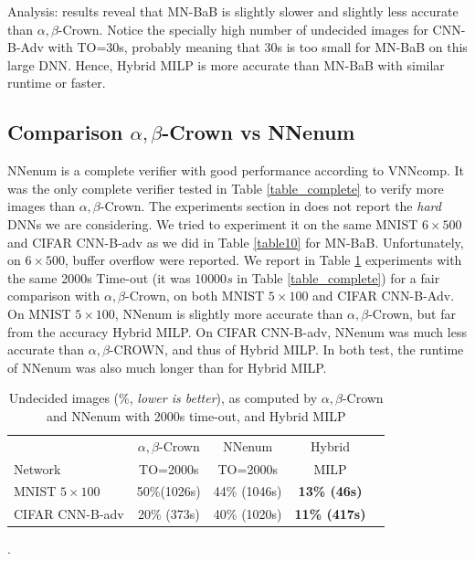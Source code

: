 {Analysis: results reveal that MN-BaB is slightly slower and slightly less accurate than $\alpha,\beta$-Crown. Notice the specially high number of undecided images for CNN-B-Adv with TO=30s, probably meaning that 30s is too small for MN-BaB on this large DNN.
Hence, Hybrid MILP is more accurate than MN-BaB with similar runtime or faster.



	\subsection*{Comparison $\alpha,\beta$-Crown vs NNenum}

NNenum \cite{nnenum} is a complete verifier with good performance according to VNNcomp.
It was the only complete verifier tested in Table \ref{table_complete} to verify more images than $\alpha,\beta$-Crown. The experiments section in \cite{nnenum} does not report
the {\em hard} DNNs we are considering. We tried to experiment it on the same MNIST 
$6 \times 500$ and CIFAR CNN-B-adv as we did in Table \ref{table10} for MN-BaB. Unfortunately, on $6 \times 500$, buffer overflow were reported.
We report in Table \ref{table11} experiments with the same 2000s Time-out (it was $10 000s$ in Table \ref{table_complete})  for a fair comparison with $\alpha,\beta$-Crown, on both 
MNIST $5 \times 100$ and CIFAR CNN-B-Adv. 
On MNIST $5 \times 100$, NNenum is slightly more accurate than $\alpha,\beta$-Crown, but far from the accuracy Hybrid MILP.
On CIFAR CNN-B-adv, NNenum was much less accurate than $\alpha,\beta$-CROWN, and thus of Hybrid MILP. In both test, the runtime of NNenum was also much longer than for Hybrid MILP.


\begin{table}[h!]
	\centering
	\begin{tabular}{||l||c||c||c||c||}
		\hline \hline
		 & $\alpha,\beta$-Crown & NNenum & Hybrid\\ 
		 Network & TO=2000s &  TO=2000s & MILP\\ 
		\hline
		MNIST $5 \times 100$ & 50\%(1026s) & 44\% (1046s) & \bf 13\% (46s)\\ \hline
		CIFAR CNN-B-adv & 20\% (373s) & 40\% (1020s) & \bf 11\% (417s)\\ \hline 
	\end{tabular}
	\caption{Undecided images ($\%$, {\em lower is better}), as computed by $\alpha,\beta$-Crown and NNenum with 2000s time-out, and Hybrid MILP}.
	\label{table11}
\end{table}


}
